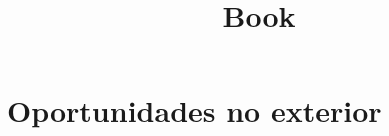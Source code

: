 \documentclass{article}
\title{Book}
\date{}
\begin{document}
\section{Oportunidades no exterior}

%
\end{document}

